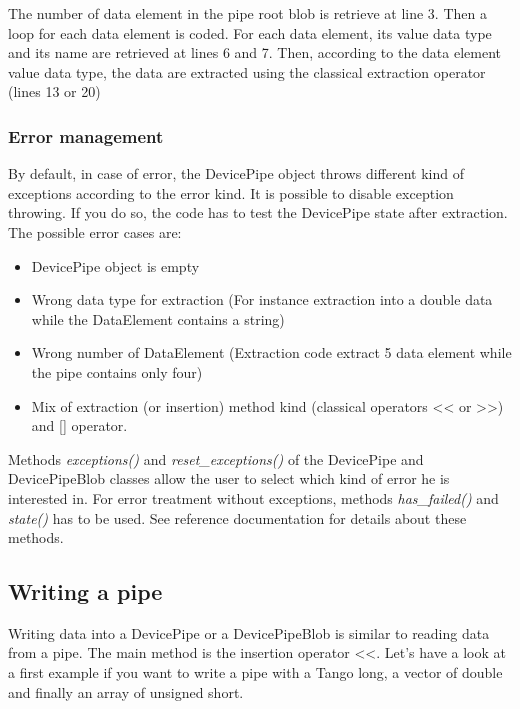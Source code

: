 The number of data element in the pipe root blob is retrieve at line
3. Then a loop for each data element is coded. For each data element,
its value data type and its name are retrieved at lines 6 and 7. Then,
according to the data element value data type, the data are extracted
using the classical extraction operator (lines 13 or 20)

\subsubsection{Error management}

By default, in case of error, the DevicePipe object throws different
kind of exceptions according to the error kind. It is possible to
disable exception throwing. If you do so, the code has to test the
DevicePipe state after extraction. The possible error cases are:
\begin{itemize}
\item DevicePipe object is empty
\item Wrong data type for extraction (For instance extraction into a double
data while the DataElement contains a string)
\item Wrong number of DataElement (Extraction code extract 5 data element
while the pipe contains only four)
\item Mix of extraction (or insertion) method kind (classical operators
<\textcompwordmark{}< or >\textcompwordmark{}>) and {[}{]} operator.
\end{itemize}
Methods \emph{exceptions()} and \emph{reset\_exceptions()} of the
DevicePipe and DevicePipeBlob classes allow the user to select which
kind of error he is interested in. For error treatment without exceptions,
methods \emph{has\_failed()} and \emph{state()} has to be used. See
reference documentation for details about these methods.

\subsection{Writing a pipe}

Writing data into a DevicePipe or a DevicePipeBlob is similar to reading
data from a pipe. The main method is the insertion operator \textquotedbl{}<\textcompwordmark{}<\textquotedbl{}.
Let's have a look at a first example if you want to write a pipe with
a Tango long, a vector of double and finally an array of unsigned
short.

